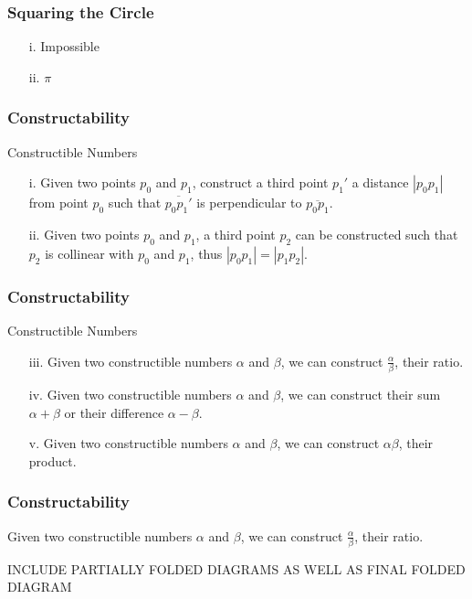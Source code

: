 \documentclass{beamer}
\begin{document}
\begin{frame}
\frametitle{Squaring the Circle}
\begin{enumerate}
\item[i.]
Impossible
\item[ii.]
$\pi$
\end{enumerate}
\end{frame}

\begin{frame}
\frametitle{Constructability}
\begin{block}{Constructible Numbers}
\begin{enumerate}
\item[i.]
Given two points $p_0$ and $p_1$, construct a third point $p_1'$ a distance $|p_0 p_1|$ from point $p_0$ such that $\overline{p_0 p_1'}$ is perpendicular to $\overline{p_0 p_1}$.
\item[ii.]
Given two points $p_0$ and $p_1$, a third point $p_2$ can be constructed such that $p_2$ is collinear with $p_0$ and $p_1$, thus $|p_0 p_1| = |p_1 p_2|$.
\end{enumerate}
\end{block}
\end{frame}

\begin{frame}
\frametitle{Constructability}
\begin{block}{Constructible Numbers}
\begin{enumerate}
\item[iii.]
Given two constructible numbers $\alpha$ and $\beta$, we can construct $\frac{\alpha}{\beta}$, their ratio.
\item[iv.]
Given two constructible numbers $\alpha$ and $\beta$, we can construct their sum $\alpha + \beta$ or their difference $\alpha - \beta$.
\item[v.]
Given two constructible numbers $\alpha$ and $\beta$, we can construct $\alpha\beta$, their product.
\end{enumerate}
\end{block}
\end{frame}

\begin{frame}
\frametitle{Constructability}
Given two constructible numbers $\alpha$ and $\beta$, we can construct $\frac{\alpha}{\beta}$, their ratio.

INCLUDE PARTIALLY FOLDED DIAGRAMS AS WELL AS FINAL FOLDED DIAGRAM
\end{frame}
\end{document}
